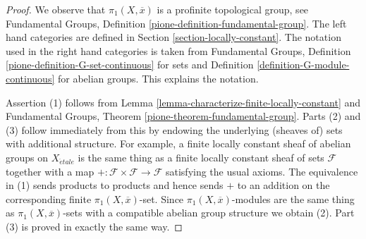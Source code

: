 \documentclass[10pt,a4paper]{amsart}
\theoremstyle{plain}
\theoremstyle{definition}
\theoremstyle{remark}
\numberwithin{equation}{subsection}
\def\etale{{\acute{e}tale}}
\begin{document}
\begin{proof}
We observe that $\pi_1(X, \overline{x})$ is a profinite
topological group, see Fundamental Groups, Definition
\ref{pione-definition-fundamental-group}.
The left hand categories are defined in
Section \ref{section-locally-constant}.
The notation used in the right hand categories is taken from
Fundamental Groups, Definition \ref{pione-definition-G-set-continuous}
for sets and
Definition \ref{definition-G-module-continuous} for abelian groups.
This explains the notation.

\medskip\noindent
Assertion (1) follows from
Lemma \ref{lemma-characterize-finite-locally-constant}
and Fundamental Groups, Theorem \ref{pione-theorem-fundamental-group}.
Parts (2) and (3) follow immediately from this by endowing the underlying
(sheaves of) sets with additional structure. For example, a finite
locally constant sheaf of abelian groups on $X_\etale$ is the same thing
as a finite locally constant sheaf of sets $\mathcal{F}$
together with a map $+ : \mathcal{F} \times \mathcal{F} \to \mathcal{F}$
satisfying the usual axioms. The equivalence in (1) sends products
to products and hence sends $+$ to an addition on the corresponding
finite $\pi_1(X, \overline{x})$-set. Since $\pi_1(X, \overline{x})$-modules
are the same thing as $\pi_1(X, \overline{x})$-sets with a compatible
abelian group structure we obtain (2). Part (3) is proved in
exactly the same way.
\end{proof}
\end{document}
